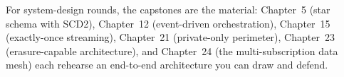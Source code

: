 \begin{notebox}
For system-design rounds, the capstones are the material: Chapter~5 (star schema with SCD2),
Chapter~12 (event-driven orchestration), Chapter~15 (exactly-once streaming), Chapter~21
(private-only perimeter), Chapter~23 (erasure-capable architecture), and Chapter~24 (the
multi-subscription data mesh) each rehearse an end-to-end architecture you can draw and defend.
\end{notebox}
